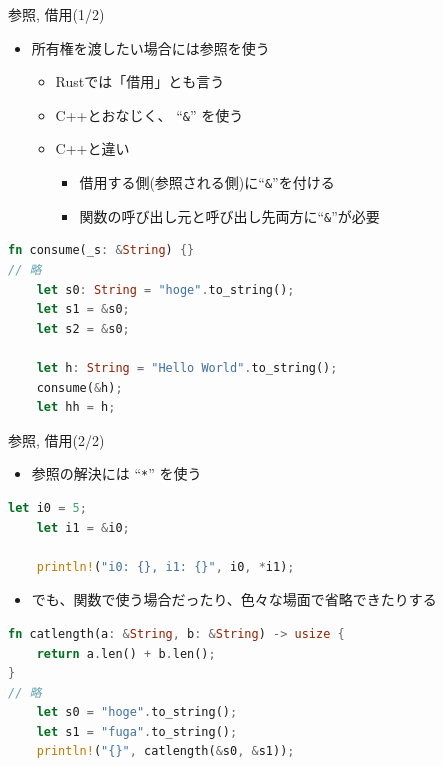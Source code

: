 \documentclass[cjk,dvipdfmx,10pt,compress,fragile%
hyperref={bookmarks=true,bookmarksnumbered=true,bookmarksopen=false,%
colorlinks=false,%
pdftitle={第 134 回 関西 Debian 勉強会},%
pdfauthor={小林},%
pdfsubject={資料},%
}]{beamer}
\begin{document}
\begin{frame}[t,fragile]{参照, 借用(1/2)}
 \begin{itemize}
  \item 所有権を渡したい場合には参照を使う
	\begin{itemize}
	 \item Rustでは「借用」とも言う
	 \item C++とおなじく、 ``\texttt{\&}'' を使う
	 \item C++と違い
	       \begin{itemize}
		\item 借用する側(参照される側)に``\texttt{\&}''を付ける
		\item 関数の呼び出し元と呼び出し先両方に``\texttt{\&}''が必要
	       \end{itemize}
	\end{itemize}
 \end{itemize}
 \begin{lstlisting}[language=Rust,style=boxed,style=colouredRust,basicstyle=\small\tt,lineskip=-2pt]
fn consume(_s: &String) {}
// 略
    let s0: String = "hoge".to_string();
    let s1 = &s0;
    let s2 = &s0;

    let h: String = "Hello World".to_string();
    consume(&h);
    let hh = h;\end{lstlisting}
\end{frame}

\begin{frame}[t,fragile]{参照, 借用(2/2)}
\begin{itemize}
 \item 参照の解決には ``\texttt{*}'' を使う
\end{itemize}
\begin{lstlisting}[language=Rust,style=boxed,style=colouredRust,basicstyle=\small\tt,lineskip=-2pt]
    let i0 = 5;
    let i1 = &i0;

    println!("i0: {}, i1: {}", i0, *i1);\end{lstlisting}
\begin{itemize}
 \item でも、関数で使う場合だったり、色々な場面で省略できたりする
\end{itemize}
\begin{lstlisting}[language=Rust,style=boxed,style=colouredRust,basicstyle=\small\tt,lineskip=-2pt]
fn catlength(a: &String, b: &String) -> usize {
    return a.len() + b.len();
}
// 略
    let s0 = "hoge".to_string();
    let s1 = "fuga".to_string();
    println!("{}", catlength(&s0, &s1));\end{lstlisting}
\end{frame}
\end{document}
